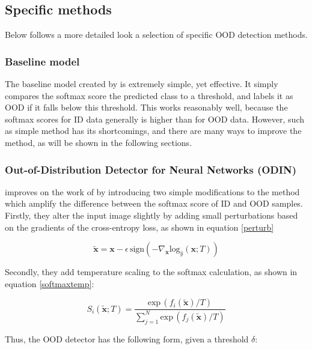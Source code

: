 \documentclass[conference,onecolumn]{IEEEtran}
\begin{document}
\subsection{Specific methods} \label{ood_specific}

Below follows a more detailed look a selection of specific OOD detection methods.

\subsubsection{Baseline model} \label{ood_baseline}

The baseline model created by \cite{oodbaseline} is extremely simple, yet effective. It simply compares the softmax score the predicted class to a threshold, and labels it as OOD if it falls below this threshold. This works reasonably well, because the softmax scores for ID data generally is higher than for OOD data. However, such as simple method has its shortcomings, and there are many ways to improve the method, as will be shown in the following sections.
\\

\subsubsection{Out-of-Distribution Detector for Neural Networks (ODIN)} \label{ood_odin}

\cite{odin} improves on the work of \cite{oodbaseline} by introducing two simple modifications to the method which amplify the difference between the softmax score of ID and OOD samples. Firstly, they alter the input image slightly by adding small perturbations based on the gradients of the cross-entropy loss, as shown in equation \ref{perturb}

\begin{equation}
\tilde{\bm{x}} = \bm{x} - \epsilon \, \text{sign}(-\nabla_{\bm{x}} \text{log}_{\hat{y}}(\bm{x};T))
\label{perturb}
\end{equation}

Secondly, they add temperature scaling to the softmax calculation, as shown in equation \ref{softmaxtemp}:

\begin{equation}
S_i(\tilde{\bm{x}} ; T) = \frac{\text{exp} \, (f_i(\tilde{\bm{x}})/T)}{\sum^N_{j=1} \text{exp} \, (f_j(\tilde{\bm{x}})/T)}
\label{softmaxtemp}
\end{equation}

Thus, the OOD detector has the following form, given a threshold $\delta$:
\end{document}
